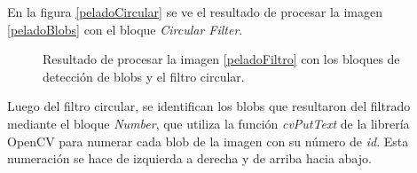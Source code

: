 En la figura \ref{peladoCircular} se ve el resultado de procesar la imagen \ref{peladoBlobs} con el bloque \emph{Circular Filter}.

\begin{figure}[ht!]
       \hspace{-1cm}
        \hspace{3 mm}
  \caption{Resultado de procesar la imagen \ref{peladoFiltro} con los bloques de detección de blobs y el filtro circular.}
      \label{ejemplocircularfilter}
\end{figure}

Luego del filtro circular, se identifican los blobs que resultaron del filtrado mediante el bloque \emph{Number}, que utiliza la función \emph{cvPutText} de la librería  OpenCV para numerar cada blob de la imagen con su número de \textit{id}. Esta numeración se hace de izquierda a derecha y de arriba hacia abajo.\\


